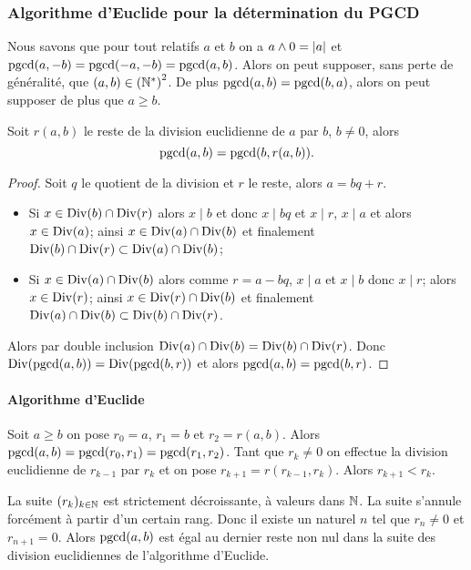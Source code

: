 \subsubsection{Algorithme d'Euclide pour la détermination du PGCD}


Nous savons que pour tout relatifs \(a\) et \(b\) on a \(a \wedge 0 = \left\lvert a\right\rvert\) et \(\operatorname{pgcd}(a,-b) = \operatorname{pgcd}(-a,-b) = \operatorname{pgcd}(a,b)\). Alors on peut supposer, sans perte de généralité, que \((a,b) \in \left(\mathbb{N}^{*}\right)^{2}\). De plus \(\operatorname{pgcd}(a,b) =\operatorname{pgcd}(b,a)\), alors on peut supposer de plus que \(a \geqslant b\).

\begin{lemme}
  Soit \(r(a,b)\) le reste de la division euclidienne de \(a\) par \(b\), \(b \neq 0\), alors
  \begin{equation}
    \operatorname{pgcd}(a,b) = \operatorname{pgcd}(b,r(a,b)).
  \end{equation}
\end{lemme}
\begin{proof}
  Soit \(q\) le quotient de la division et \(r\) le reste, alors \(a=bq+r\).
  \begin{itemize}
  \item Si \(x \in \operatorname{Div}(b) \cap \operatorname{Div}(r)\) alors \(x \mid b\) et donc \(x \mid bq\) et \(x \mid r\), \(x \mid a\) et alors \(x \in \operatorname{Div}(a)\); ainsi \(x \in \operatorname{Div}(a) \cap \operatorname{Div}(b)\) et finalement \(\operatorname{Div}(b) \cap \operatorname{Div}(r) \subset \operatorname{Div}(a) \cap \operatorname{Div}(b)\);
  \item Si \(x \in \operatorname{Div}(a) \cap \operatorname{Div}(b)\) alors comme \(r=a-bq\), \(x \mid a\) et \(x \mid b\) donc \(x \mid r\); alors \(x \in \operatorname{Div}(r)\); ainsi \(x \in \operatorname{Div}(r) \cap \operatorname{Div}(b)\) et finalement \(\operatorname{Div}(a) \cap \operatorname{Div}(b) \subset \operatorname{Div}(b) \cap \operatorname{Div}(r)\).
  \end{itemize}
  Alors par double inclusion \(\operatorname{Div}(a) \cap \operatorname{Div}(b)= \operatorname{Div}(b) \cap \operatorname{Div}(r)\). Donc \(\operatorname{Div}(\operatorname{pgcd}(a,b)) = \operatorname{Div}(\operatorname{pgcd}(b,r))\) et alors \(\operatorname{pgcd}(a,b) = \operatorname{pgcd}(b,r)\).
\end{proof}

\paragraph{Algorithme d'Euclide}

Soit \(a \geqslant b\) on pose \(r_0=a\), \(r_1=b\) et \(r_2=r(a,b)\). Alors \(\operatorname{pgcd}(a,b) = \operatorname{pgcd}(r_0, r_1) = \operatorname{pgcd}(r_1,r_2)\). Tant que \(r_k \neq 0\) on effectue la division euclidienne de \(r_{k-1}\) par \(r_k\) et on pose \(r_{k+1}=r(r_{k-1},r_k)\). Alors \(r_{k+1} < r_k\).

La suite \((r_k)_{k \in \mathbb{N}}\) est strictement décroissante, à valeurs dans \(\mathbb{N}\). La suite s'annule forcément à partir d'un certain rang. Donc il existe un naturel \(n\) tel que \(r_n \neq 0\) et \(r_{n+1}=0\). Alors \(\operatorname{pgcd}(a,b)\) est égal au dernier reste non nul dans la suite des division euclidiennes de l'algorithme d'Euclide.

